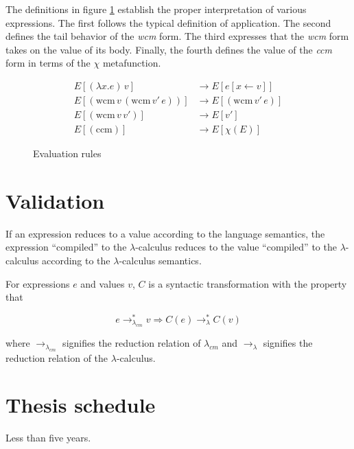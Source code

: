 \documentclass[ms]{byuprop}
\newcounter{definition}
\newtheorem*{cmtheorem}{C:\lambda_{CM}\rightarrow\lambda Meaning Preservation Extravaganza}
\begin{document}
The definitions in figure \ref{language-semantics} establish the proper interpretation of 
various expressions. The first follows the typical definition of application. The second 
defines the tail behavior of the \emph{wcm} form. The third expresses that the \emph{wcm} 
form takes on the value of its body. Finally, the fourth defines the value of the \emph{ccm} 
form in terms of the $\chi$ metafunction.

\begin{figure}
\begin{align*}
E[(\lambda x.e)\,v]                         &\rightarrow E[e[x\leftarrow v]]\\
E[(\mathrm{wcm}\,v\,(\mathrm{wcm}\,v'\,e))] &\rightarrow E[(\mathrm{wcm}\,v'\,e)]\\
E[(\mathrm{wcm}\,v\,v')]                    &\rightarrow E[v']\\
E[(\mathrm{ccm})]                           &\rightarrow E[\chi(E)]
\end{align*}
\caption{Evaluation rules}
\label{language-semantics}
\end{figure}

\section{Validation}

If an expression reduces to a value according to the language semantics, the expression ``compiled'' to the $\lambda$-calculus reduces to the value ``compiled'' to the $\lambda$-calculus according to the $\lambda$-calculus semantics.


For expressions $e$ and values $v$, $C$ is a syntactic transformation with the property that

\[
e\rightarrow^{*}_{\lambda_{cm}}v\Rightarrow C(e)\rightarrow^{*}_{\lambda}C(v)
\]

where $\rightarrow_{\lambda_{cm}}$ signifies the reduction relation of $\lambda_{cm}$ and $\rightarrow_{\lambda}$ signifies the reduction relation of the $\lambda$-calculus.


\section{Thesis schedule}

Less than five years.
\end{document}
